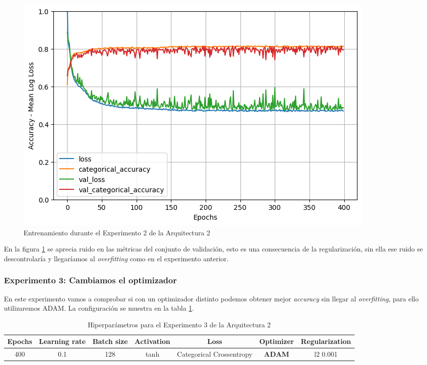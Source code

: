 \documentclass{article}
\begin{document}
			\begin{figure}[!h]
				\begin{center}
					\includegraphics[scale=0.25]{d-tr-a2-e2.png}		
					\caption{Entrenamiento durante el Experimento 2 de la Arquitectura 2}	
					\label{d-tr-a2-e2}
				\end{center}
			\end{figure}
			
			\newpage
			En la figura \ref{d-tr-a2-e2} se aprecia ruido en las m\'etricas del conjunto de validaci\'on, esto es una consecuencia de la regularizaci\'on, sin ella ese ruido se descontrolar\'ia y llegar\'iamos al \textit{overfitting} como en el experimento anterior.
			
		\subsubsection{Experimento 3: Cambiamos el optimizador}
		\label{d-s-a2-e3}
			En este experimento vamos a comprobar si con un optimizador distinto podemos obtener mejor \textit{accuracy} sin llegar al \textit{overfitting}, para ello utilizaremos ADAM. La configuraci\'on se muestra en la tabla \ref{tab:hip-d-a2-e3}.
			
			\begin{table}[!h]
				\begin{center}
					\begin{tabular}{| c | c | c | c | c | c | c |}
						\textbf{Epochs} & \textbf{Learning rate} & \textbf{Batch size} & \textbf{Activation} & \textbf{Loss} & \textbf{Optimizer} & \textbf{Regularization} \\ \hline
						400 & 0.1 & 128 & tanh & Categorical Crossentropy & \textbf{ADAM} & l2 0.001
					\end{tabular}
					\caption{Hiperpar\'ametros para el Experimento 3 de la Arquitectura 2}
					\label{tab:hip-d-a2-e3}
				\end{center}
			\end{table}
			
\end{document}
